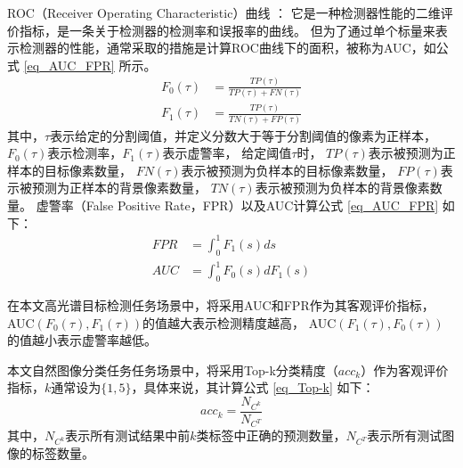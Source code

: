 \documentclass{xdupgthesis}
\begin{document}
ROC（Receiver Operating Characteristic）曲线 \cite{swets2000better}：
它是一种检测器性能的二维评价指标，是一条关于检测器的检测率和误报率的曲线。
但为了通过单个标量来表示检测器的性能，通常采取的措施是计算ROC曲线下的面积，被称为AUC\cite{bradley1997use}，如公式 \eqref{eq_AUC_FPR} 所示。
\begin{equation}
    \begin{aligned}
        F_{0}\left(\tau\right) &= \frac{TP\left(\tau\right)}{TP\left(\tau\right)+FN\left(\tau\right)} \\
        F_{1}\left(\tau\right) &= \frac{TP\left(\tau\right)}{TN\left(\tau\right)+FP\left(\tau\right)}
    \end{aligned}
\end{equation}
其中，$\tau$表示给定的分割阈值，并定义分数大于等于分割阈值的像素为正样本，
$F_{0}\left(\tau\right)$表示检测率，$F_{1}\left(\tau\right)$表示虚警率，
给定阈值$\tau$时，
$TP\left(\tau\right)$表示被预测为正样本的目标像素数量，
$FN\left(\tau\right)$表示被预测为负样本的目标像素数量，
$FP\left(\tau\right)$表示被预测为正样本的背景像素数量，
$TN\left(\tau\right)$表示被预测为负样本的背景像素数量。
虚警率（False Positive Rate，FPR）以及AUC计算公式 \eqref{eq_AUC_FPR} 如下：
\begin{equation}
    \begin{aligned}
        FPR &= \int_{0}^{1} F_{1}(s)ds \\
        AUC &= \int_{0}^{1} F_{0}(s)dF_{1}(s)
    \end{aligned}
    \label{eq_AUC_FPR}
\end{equation}

在本文高光谱目标检测任务场景中，将采用AUC和FPR作为其客观评价指标，
AUC$\left(F_{0}(\tau), F_{1}(\tau)\right)$的值越大表示检测精度越高，
AUC$\left(F_{1}(\tau), F_{0}(\tau)\right)$的值越小表示虚警率越低。

本文自然图像分类任务任务场景中，将采用Top-k分类精度（$acc_{k}$）作为客观评价指标，$k$通常设为${\{1, 5\}}$，具体来说，其计算公式 \eqref{eq_Top-k} 如下：
\begin{equation}
    acc_{k} = \frac{N_{C^{k}}}{N_{C^{T}}}
    \label{eq_Top-k}
\end{equation}
其中，$N_{C^{k}}$表示所有测试结果中前$k$类标签中正确的预测数量，$N_{C^{T}}$表示所有测试图像的标签数量。
\end{document}
